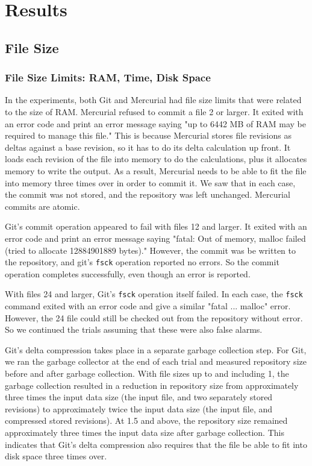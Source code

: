 \section{Results}

\subsection{File Size}

\subsubsection{File Size Limits: RAM, Time, Disk Space}


In the experiments, both Git and Mercurial had file size limits that were related to the size of RAM.
Mercurial refused to commit a file \SI{2}{\gib} or larger.
It exited with an error code and print an error message saying "up to 6442 MB of RAM may be required to manage this file."
This is because Mercurial stores file revisions as deltas against a base revision, so it has to do its delta calculation up front.
It loads each revision of the file into memory to do the calculations, plus it allocates memory to write the output.
As a result, Mercurial needs to be able to fit the file into memory three times over in order to commit it.
We saw that in each case, the commit was not stored, and the repository was left unchanged.
Mercurial commits are atomic.

Git's commit operation appeared to fail with files \SI{12}{\gib} and larger.
It exited with an error code and print an error message saying "fatal: Out of memory, malloc failed (tried to allocate 12884901889 bytes)."
However, the commit was be written to the repository, and git's \lstinline{fsck} operation reported no errors.
So the commit operation completes successfully, even though an error is reported.

With files \SI{24}{\gib} and larger, Git's \lstinline{fsck} operation itself failed.
In each case, the \lstinline{fsck} command exited with an error code and give a similar "fatal ... malloc" error.
However, the \SI{24}{\gib} file could still be checked out from the repository without error.
So we continued the trials assuming that these were also false alarms.

Git's delta compression takes place in a separate garbage collection step.
For Git, we ran the garbage collector at the end of each trial and measured repository size before and after garbage collection.
With file sizes up to and including \SI{1}{\gib}, the garbage collection resulted in a reduction in repository size from approximately three times the input data size (the input file, and two separately stored revisions) to approximately twice the input data size (the input file, and compressed stored revisions).
At \SI{1.5}{\gib} and above, the repository size remained approximately three times the input data size after garbage collection.
This indicates that Git's delta compression also requires that the file be able to fit into disk space three times over.

